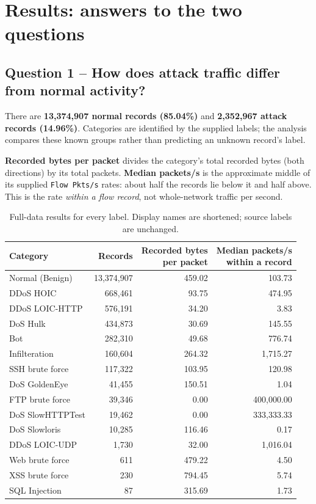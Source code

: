 \documentclass[10pt,a4paper]{article}
\begin{document}
\newpage
\section{Results: answers to the two questions}
\subsection*{Question 1 -- How does attack traffic differ from normal activity?}
There are \textbf{13,374,907 normal records (85.04\%)} and \textbf{2,352,967 attack records (14.96\%)}. Categories are identified by the supplied labels; the analysis compares these known groups rather than predicting an unknown record's label.

\textbf{Recorded bytes per packet} divides the category's total recorded bytes (both directions) by its total packets. \textbf{Median packets/s} is the approximate middle of its supplied \texttt{Flow Pkts/s} rates: about half the records lie below it and half above. This is the rate \emph{within a flow record}, not whole-network traffic per second.

\begin{table}[H]\centering\small
\caption{Full-data results for every label. Display names are shortened; source labels are unchanged.}
\begin{tabular}{@{}lrrr@{}}
\toprule
Category & Records & \shortstack{Recorded bytes\\per packet} & \shortstack{Median packets/s\\within a record} \\
\midrule
Normal (Benign) & 13,374,907 & 459.02 & 103.73 \\
DDoS HOIC & 668,461 & 93.75 & 474.95 \\
DDoS LOIC-HTTP & 576,191 & 34.20 & 3.83 \\
DoS Hulk & 434,873 & 30.69 & 145.55 \\
Bot & 282,310 & 49.68 & 776.74 \\
Infilteration & 160,604 & 264.32 & 1,715.27 \\
SSH brute force & 117,322 & 103.95 & 120.98 \\
DoS GoldenEye & 41,455 & 150.51 & 1.04 \\
FTP brute force & 39,346 & 0.00 & 400,000.00 \\
DoS SlowHTTPTest & 19,462 & 0.00 & 333,333.33 \\
DoS Slowloris & 10,285 & 116.46 & 0.17 \\
DDoS LOIC-UDP & 1,730 & 32.00 & 1,016.04 \\
Web brute force & 611 & 479.22 & 4.50 \\
XSS brute force & 230 & 794.45 & 5.74 \\
SQL Injection & 87 & 315.69 & 1.73 \\
\bottomrule
\end{tabular}
\end{table}
\end{document}
